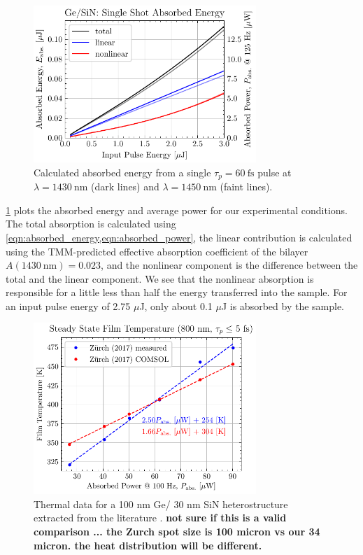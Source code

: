 \begin{figure}
	\centering
	\includegraphics[width=0.75\textwidth]{figures/chap4/Single_shot_abs_ener.pdf}
	\caption{Calculated absorbed energy from a single $\tau_p = 60 \ \textrm{fs}$ pulse at $\lambda=1430 \ \textrm{nm}$ (dark lines) and $\lambda = 1450 \ \textrm{nm}$ (faint lines).}
	\label{fig:Single_shot_abs_ener}
\end{figure}

\cref{fig:Single_shot_abs_ener} plots the absorbed energy and average power for our experimental conditions. The total absorption is calculated using \cref{eqn:absorbed_energy,eqn:absorbed_power}, the linear contribution is calculated using the TMM-predicted effective absorption coefficient of the bilayer $A (1430 \ \textrm{nm}) = 0.023$, and the nonlinear component is the difference between the total and the linear component. We see that the nonlinear absorption is responsible for a little less than half the energy transferred into the sample. For an input pulse energy of 2.75 $\mu$J, only about 0.1 $\mu$J is absorbed by the sample.

\begin{figure}
	\centering
	\includegraphics[width=0.75\textwidth]{figures/chap4/COMSOL_temp_power.pdf}
	\caption{Thermal data for a 100 nm Ge/ 30 nm SiN heterostructure extracted from the literature \cite{zurchDirectSimultaneousObservation2017}. \textbf{not sure if this is a valid comparison ... the Zurch spot size is 100 micron vs our 34 micron. the heat distribution will be different.}}
	\label{fig:COMSOL_temp_power}
\end{figure}

